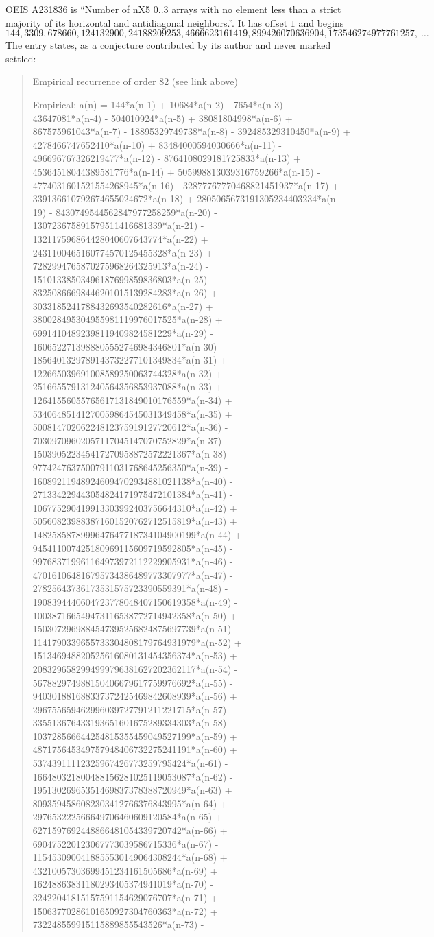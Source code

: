 \documentclass[11pt,a4paper]{article}
\theoremstyle{plain}
\theoremstyle{definition}
\begin{document}
OEIS A231836 is ``Number of nX5 0..3 arrays with no element less than a strict majority of its horizontal and antidiagonal neighbors.''. It has offset $1$ and begins
\[
144, 3309, 678660, 124132900, 24188209253, 4666623161419, 899426070636904, 173546274977761257,\ \dots
\]
The entry states, as a conjecture contributed by its author and never marked settled:
\begin{quote}
Empirical recurrence of order 82 (see link above)

Empirical: a(n) = 144*a(n-1) + 10684*a(n-2) - 7654*a(n-3) - 43647081*a(n-4) - 504010924*a(n-5) + 38081804998*a(n-6) + 867575961043*a(n-7) - 18895329749738*a(n-8) - 392485329310450*a(n-9) + 4278466747652410*a(n-10) + 83484000594030666*a(n-11) - 496696767326219477*a(n-12) - 8764108029181725833*a(n-13) + 45364518044389581776*a(n-14) + 505998813039316759266*a(n-15) - 4774031601521554268945*a(n-16) - 32877767770468821451937*a(n-17) + 339136610792674655024672*a(n-18) + 2805065673191305234403234*a(n-19) - 8430749544562847977258259*a(n-20) - 130723675891579511416681339*a(n-21) - 132117596864428040607643774*a(n-22) + 2431100465160774570125455328*a(n-23) + 7282994765870275968264325913*a(n-24) - 15101338503496187699859836803*a(n-25) - 83250866698446201015139284283*a(n-26) + 3033185241788432693540282616*a(n-27) + 380028495304955981119976017525*a(n-28) + 69914104892398119409824581229*a(n-29) - 1606522713988805552746984346801*a(n-30) - 1856401329789143732277101349834*a(n-31) + 122665039691008589250063744328*a(n-32) + 251665579131240564356853937088*a(n-33) + 12641556055765617131849010176559*a(n-34) + 53406485141270059864545031349458*a(n-35) + 50081470206224812375919127720612*a(n-36) - 70309709602057117045147070752829*a(n-37) - 150390522345417270958872572221367*a(n-38) - 97742476375007911031768645256350*a(n-39) - 160892119489246094702934881021138*a(n-40) - 271334229443054824171975472101384*a(n-41) - 106775290419913303992403756644310*a(n-42) + 505608239883871601520762712515819*a(n-43) + 1482585878999647647718734104900199*a(n-44) + 945411007425180969115609719592805*a(n-45) - 997683719961164973972112229905931*a(n-46) - 470161064816795734386489773307977*a(n-47) - 27825643736173531575723390559391*a(n-48) - 1908394440604723778048407150619358*a(n-49) - 100387166549473116538772714942358*a(n-50) + 1503072969884547395256824875697739*a(n-51) - 1141790339655733304808179764931979*a(n-52) + 151346948820525616080131454356374*a(n-53) + 2083296582994999796381627202362117*a(n-54) - 567882974988150406679617759976692*a(n-55) - 940301881688337372425469842608939*a(n-56) + 296755659462996039727791211221715*a(n-57) - 335513676433193651601675289334303*a(n-58) - 103728566644254815355459049527199*a(n-59) + 487175645349757948406732275241191*a(n-60) + 53743911112325967426773259795424*a(n-61) - 166480321800488156281025119053087*a(n-62) - 19513026965351469837378388720949*a(n-63) + 8093594586082303412766376843995*a(n-64) + 297653222566649706460609120584*a(n-65) + 6271597692448866481054339720742*a(n-66) + 690475220123067773039586715336*a(n-67) - 1154530900418855530149064308244*a(n-68) + 43210057303699451234161505686*a(n-69) + 16248863831180293405374941019*a(n-70) - 32422041815157591154629076707*a(n-71) + 15063770286101650927304760363*a(n-72) + 732248559915115889855543526*a(n-73) - 
\end{quote}
\end{document}
